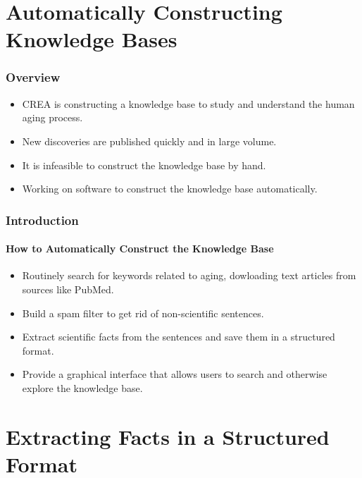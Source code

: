 \documentclass[mathserif]{beamer}
\begin{document}
\section{Automatically Constructing Knowledge Bases}

\begin{frame}

\frametitle{Overview}

\begin{itemize}[<+->]

\item CREA is constructing a knowledge base to study and
understand the human aging process.
\item New discoveries are published quickly and in large
volume.
\item It is infeasible to construct the knowledge base by
hand.
\item Working on software to construct the knowledge base
automatically.

\end{itemize}

\end{frame}

\begin{frame}

\frametitle{Introduction}
\framesubtitle{How to Automatically Construct the Knowledge Base}

\begin{itemize}[<+->]

\item Routinely search for keywords related to aging, dowloading
text articles from sources like PubMed.
\item Build a spam filter to get rid of non-scientific sentences.
\item Extract scientific facts from the sentences and save them
in a structured format.
\item Provide a graphical interface that allows users to search
and otherwise explore the knowledge base.

\end{itemize}

\end{frame}

\section{Extracting Facts in a Structured Format}
\end{document}
